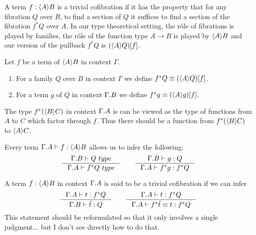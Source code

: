 A term $f:\ctxwk{A}{B}$ is a trivial cofibration if it has the
property that for any fibration $Q$ over $B$,
to find a section of $Q$ it suffices to find a section of the fibration
$f^\ast Q$ over $A$. In our type theoretical setting, the rôle of fibrations
is played by families, the rôle of the function type $A\to B$ is played by
$\ctxwk{A}{B}$ and our version of the pullback $f^\ast Q$ is $\subst{f}{\ctxwk{A}{Q}}$.

\begin{defn}
Let $f$ be a term of $\ctxwk{A}{B}$ in context $\Gamma$.
\begin{enumerate}
\item For a family $Q$ over $B$ in context $\Gamma$ we define $f^\ast Q\jdeq\subst{f}{\ctxwk{A}{Q}}$.
\item For a term $g$ of $Q$ in context $\ctxext{\Gamma}{B}$ we define $f^\ast g\jdeq\subst{f}{\ctxwk{A}{g}}$.
\end{enumerate} 
\end{defn}
\begin{rmk}
The type $f^\ast(\ctxwk{B}{C})$ in context $\ctxext{\Gamma}{A}$ is can be viewed as the
type of functions from $A$ to $C$ which factor through $f$. Thus there should be
a function from $f^\ast(\ctxwk{B}{C})$ to $\ctxwk{A}{C}$.
\end{rmk}

\begin{rmk}
Every term $\jterm{\ctxext{\Gamma}{A}}{\ctxwk{A}{B}}{f}$ allows us to infer the following:
\begin{equation*}
\inference{\jtype{\ctxext{\Gamma}{B}}{Q}}{\jtype{\ctxext{\Gamma}{A}}{f^\ast Q}}
\qquad
\inference{\jterm{\ctxext{\Gamma}{B}}{Q}{g}}{\jterm{\ctxext{\Gamma}{A}}{f^\ast Q}{f^\ast g}}
\end{equation*}
\end{rmk}


\begin{defn}
A term $f:\ctxwk{A}{B}$ in context $\ctxext{\Gamma}{A}$ is said to be a trivial
cofibration if we can infer
\begin{equation*}
\inference{\jterm{\ctxext{\Gamma}{A}}{f^\ast Q}{t}}{\jterm{\ctxext{\Gamma}{B}}{Q}{\tilde{t}}}\qquad
\inference{\jterm{\ctxext{\Gamma}{A}}{f^\ast Q}{t}}{\jtermeq{\ctxext{\Gamma}{A}}{f^\ast Q}{f^\ast \tilde{t}}{t}}
\end{equation*}
{\color{red}This statement should be reformulated so that it only involves a single judgment...
but I don't see directly how to do that.}
\end{defn}

